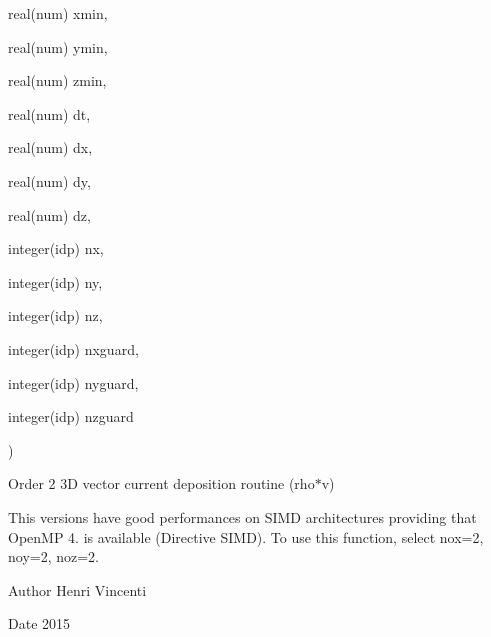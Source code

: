 {\begin{DoxyParamCaption}
\item[{real(num)}]{xmin, }
\item[{real(num)}]{ymin, }
\item[{real(num)}]{zmin, }
\item[{real(num)}]{dt, }
\item[{real(num)}]{dx, }
\item[{real(num)}]{dy, }
\item[{real(num)}]{dz, }
\item[{integer(idp)}]{nx, }
\item[{integer(idp)}]{ny, }
\item[{integer(idp)}]{nz, }
\item[{integer(idp)}]{nxguard, }
\item[{integer(idp)}]{nyguard, }
\item[{integer(idp)}]{nzguard}
\end{DoxyParamCaption}
)}\hypertarget{current__deposition_8_f90_a82878814b59bae3273786c1c0e92deb6}{}\label{current__deposition_8_f90_a82878814b59bae3273786c1c0e92deb6}


Order 2 3D vector current deposition routine (rho$\ast$v) 

This versions have good performances on S\+I\+MD architectures providing that Open\+MP 4. is available (Directive S\+I\+MD). To use this function, select nox=2, noy=2, noz=2. \begin{DoxyAuthor}{Author}
Henri Vincenti 
\end{DoxyAuthor}
\begin{DoxyDate}{Date}
2015 
\end{DoxyDate}
